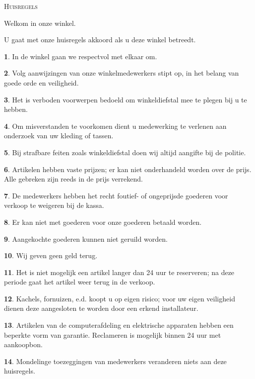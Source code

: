 \documentclass[a4paper,14pt]{extarticle}
\theoremstyle{definition}
\newtheorem{regel}{}
\begin{document}
\thispagestyle{empty}
\centerline{\LARGE\textsc{Huisregels}}
\vskip 0.5cm
\centerline{Welkom in onze winkel.} 
\centerline{U gaat met onze huisregels akkoord als u deze winkel betreedt.}
\vskip 1cm

\begin{regel}
In de winkel gaan we respectvol met elkaar om.
\end{regel}
\begin{regel}
Volg aanwijzingen van onze winkelmedewerkers stipt op, in het belang van goede orde en veiligheid.
\end{regel}
\begin{regel}
Het is verboden voorwerpen bedoeld om winkeldiefstal mee te plegen bij u te hebben.
\end{regel}
\begin{regel}
Om misverstanden te voorkomen dient u medewerking te verlenen aan onderzoek van uw kleding of tassen.
\end{regel}
\begin{regel}
Bij strafbare feiten zoals winkeldiefstal doen wij altijd aangifte bij de politie.
\end{regel}
\begin{regel}
Artikelen hebben vaste prijzen; er kan niet onderhandeld worden over de prijs. Alle gebreken zijn reeds in de prijs verrekend.
\end{regel}
\begin{regel}
De medewerkers hebben het recht foutief- of ongeprijsde goederen voor verkoop te weigeren bij de kassa.
\end{regel}
\begin{regel}
Er kan niet met goederen voor onze goederen betaald worden.
\end{regel}
\begin{regel}
Aangekochte goederen kunnen niet geruild worden.
\end{regel}
\begin{regel}
Wij geven geen geld terug.
\end{regel}
\begin{regel}
Het is niet mogelijk een artikel langer dan 24 uur te reserveren; na deze periode gaat het artikel weer terug in de verkoop.
\end{regel}
\begin{regel}
Kachels, fornuizen, e.d. koopt u op eigen risico; voor uw eigen veiligheid dienen deze aangesloten te worden door een erkend installateur.
\end{regel}
\begin{regel}
Artikelen van de computerafdeling en elektrische apparaten hebben een beperkte vorm van garantie. Reclameren is mogelijk binnen 24 uur met aankoopbon.
\end{regel}
\begin{regel}
Mondelinge toezeggingen van medewerkers veranderen niets aan deze huisregels.
\end{regel}
\end{document}
